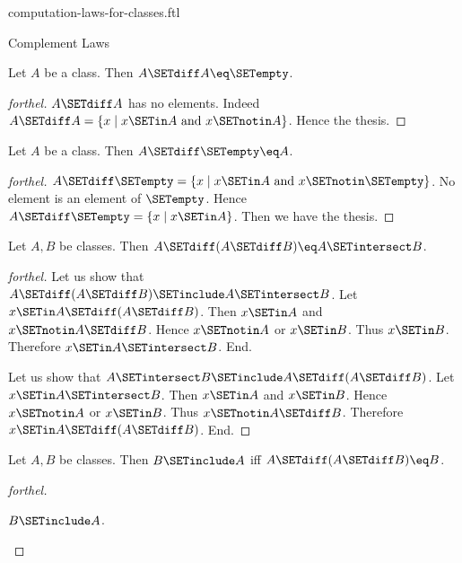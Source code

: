 \documentclass{naproche-library}
\begin{document}
\begin{smodule}[title=Computation Laws For Classes]{computation-laws-for-classes.ftl}
\begin{sfragment}{Complement Laws}
  \begin{proposition}[forthel,id=FOUNDATIONS_02_7433299337150464]
    Let $A$ be a class.
    Then $A \SETdiff A \eq \SETempty$.
  \end{proposition}
  \begin{proof}[forthel]
    $A \SETdiff A$ has no elements.
    Indeed $A \SETdiff A = \{ x \mid x \SETin A\text{ and }x \SETnotin A \}$.
    Hence the thesis.
  \end{proof}

  \begin{proposition}[forthel,id=FOUNDATIONS_02_3783696985358336]
    Let $A$ be a class.
    Then $A \SETdiff \SETempty \eq A$.
  \end{proposition}
  \begin{proof}[forthel]
    $A \SETdiff \SETempty = \{ x \mid x \SETin A\text{ and }x \SETnotin \SETempty \}$.
    No element is an element of $\SETempty$.
    Hence $A \SETdiff \SETempty = \{ x \mid x \SETin A \}$.
    Then we have the thesis.
  \end{proof}

  \begin{proposition}[forthel,id=FOUNDATIONS_02_7083929257377792]
    Let $A, B$ be classes.
    Then $A \SETdiff (A \SETdiff B) \eq A \SETintersect B$.
  \end{proposition}
  \begin{proof}[forthel]
    Let us show that $A \SETdiff (A \SETdiff B) \SETinclude A \SETintersect B$.
      Let $x \SETin A \SETdiff (A \SETdiff B)$.
      Then $x \SETin A$ and $x \SETnotin A \SETdiff B$.
      Hence $x \SETnotin A$ or $x \SETin B$.
      Thus $x \SETin B$.
      Therefore $x \SETin A \SETintersect B$.
    End.

    Let us show that $A \SETintersect B \SETinclude A \SETdiff (A \SETdiff B)$.
      Let $x \SETin A \SETintersect B$.
      Then $x \SETin A$ and $x \SETin B$.
      Hence $x \SETnotin A$ or $x \SETin B$.
      Thus $x \SETnotin A \SETdiff B$.
      Therefore $x \SETin A \SETdiff (A \SETdiff B)$.
    End.
  \end{proof}

  \begin{proposition}[forthel,id=FOUNDATIONS_02_4938646769631232]
    Let $A, B$ be classes.
    Then $B \SETinclude A$ iff $A \SETdiff (A \SETdiff B) \eq B$.
  \end{proposition}
  \begin{proof}[forthel]
    \begin{case}{$B \SETinclude A$.} \end{case}


\end{proof}
\end{sfragment}
\end{smodule}
\end{document}
